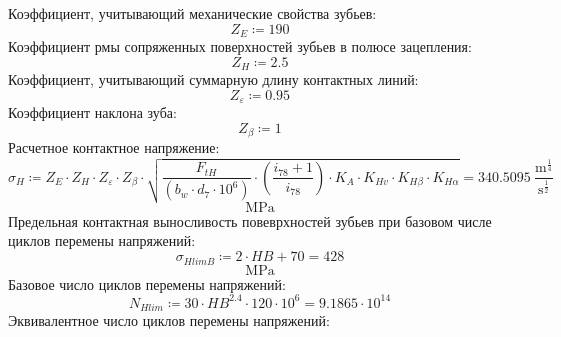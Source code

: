 \documentclass{article}
\newcommand{\defeq}{\coloneq} %
\begin{document}
\colorbox[HTML]{000000}{Коэффициент, учитывающий механические свойства зубьев:}\newline
\begin{equation*}
Z_{E} \defeq 190
\end{equation*}
\colorbox[HTML]{000000}{Коэффициент рмы сопряженных поверхностей зубьев в полюсе зацепления:}\newline
\begin{equation*}
Z_{H} \defeq 2.5
\end{equation*}
\colorbox[HTML]{000000}{Коэффициент, учитывающий суммарную длину контактных линий:}\newline
\begin{equation*}
Z_{ε} \defeq 0.95
\end{equation*}
\colorbox[HTML]{000000}{Коэффициент наклона зуба:}\newline
\begin{equation*}
Z_{β} \defeq 1
\end{equation*}
\colorbox[HTML]{000000}{Расчетное контактное напряжение:}\newline
\begin{equation*}
σ_{H} \defeq Z_{E} \cdot Z_{H} \cdot Z_{ε} \cdot Z_{β} \cdot \sqrt{\frac{F_{tH}}{\left( b_{w} \cdot \textit{d}_{\textit{7}} \cdot 10^{6} \right)} \cdot \left( \frac{\textit{i}_{\textit{78}}+1}{\textit{i}_{\textit{78}}} \right) \cdot K_{A} \cdot K_{Hv} \cdot K_{Hβ} \cdot K_{Hα}} = {340.5095 \: \frac{\mathrm{m}^{\frac{1}{4}}}{\mathrm{s}^{\frac{1}{2}}}}
\end{equation*}
\begin{equation*}
\mathrm{MPa}
\end{equation*}
\colorbox[HTML]{000000}{Предельная контактная выносливость повеврхностей зубьев при базовом числе циклов перемены напряжений:}\newline
\begin{equation*}
σ_{HlimB} \defeq 2 \cdot HB+70 = {428}
\end{equation*}
\begin{equation*}
\mathrm{MPa}
\end{equation*}
\colorbox[HTML]{000000}{Базовое число циклов перемены напряжений:}\newline
\begin{equation*}
N_{Hlim} \defeq 30 \cdot HB^{2.4} \cdot 120 \cdot 10^{6} = {9.1865 \cdot 10^{14}}
\end{equation*}
\colorbox[HTML]{000000}{Эквивалентное число циклов перемены напряжений:}\newline
\end{document}

